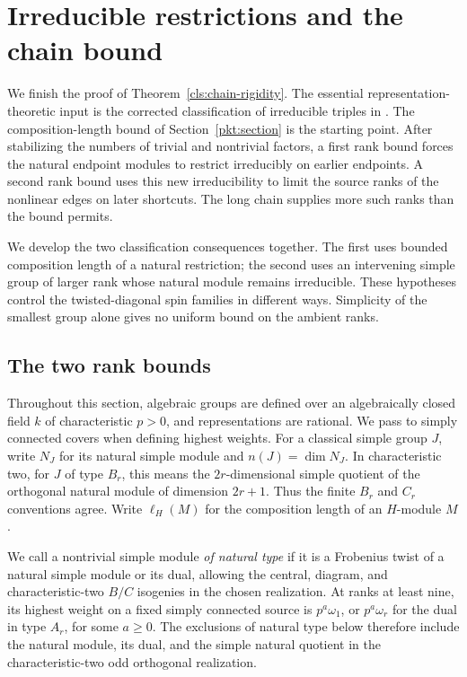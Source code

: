\section{Irreducible restrictions and the chain bound}
\label{sec:rigidity}

We finish the proof of Theorem~\ref{cls:chain-rigidity}.  The essential
representation-theoretic input is the corrected classification of irreducible
triples in \cite[Theorem~4.1 and Table~3]{BurnessTesterman2018}.
The composition-length bound of Section~\ref{pkt:section} is the starting
point.  After stabilizing the numbers of trivial and nontrivial factors,
a first rank bound forces the natural endpoint modules to restrict
irreducibly on earlier endpoints.  A second rank bound uses this new
irreducibility to limit the source ranks of the nonlinear edges on later
shortcuts.  The long chain supplies more such ranks than the bound permits.

We develop the two classification consequences together.  The first uses
bounded composition length of a natural restriction; the second uses an
intervening simple group of larger rank whose natural module remains
irreducible.  These hypotheses control the twisted-diagonal spin families
in different ways.  Simplicity of the smallest group alone gives no
uniform bound on the ambient ranks.

\subsection{The two rank bounds}

Throughout this section, algebraic groups are defined over an algebraically
closed field $k$ of characteristic $p>0$, and representations are rational.
We pass to simply connected covers when defining highest weights.  For a
classical simple group $J$, write $N_J$ for its natural simple module and
$n(J)=\dim N_J$.  In characteristic two, for $J$ of type $B_r$, this means the
$2r$-dimensional simple quotient of the orthogonal natural module of dimension
$2r+1$.  Thus the finite $B_r$ and $C_r$ conventions agree.  Write
$\ell_H(M)$ for the composition length of an $H$-module $M$.

We call a nontrivial simple module \emph{of natural type} if it is a Frobenius
twist of a natural simple module or its dual, allowing the central, diagram,
and characteristic-two $B/C$ isogenies in the chosen realization.  At ranks
at least nine, its highest weight on a fixed simply connected source is
$p^a\omega_1$, or $p^a\omega_r$ for the dual in type $A_r$, for some $a\geq0$.
The exclusions of natural type below therefore include the natural module,
its dual, and the simple natural quotient in the characteristic-two odd
orthogonal realization.

